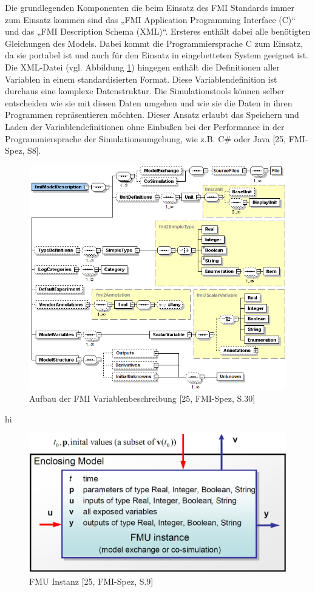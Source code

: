 Die grundlegenden Komponenten die beim Einsatz des FMI Standards immer zum Einsatz kommen sind das „FMI Application Programming Interface (C)“ und das „FMI Description Schema (XML)“. Ersteres enthält dabei alle benötigten Gleichungen des Models. Dabei kommt die Programmiersprache C zum Einsatz, da sie portabel ist und auch für den Einsatz in eingebetteten System geeignet ist. Die XML-Datei (vgl. Abbildung \ref{fig:FMIOverview}) hingegen enthält die Definitionen aller Variablen in einem standardisierten Format. Diese Variablendefinition ist durchaus eine komplexe Datenstruktur. Die Simulationstools können selber entscheiden wie sie mit diesen Daten umgehen und wie sie die Daten in ihren Programmen repräsentieren möchten. Dieser Ansatz erlaubt das Speichern und Laden der Variablendefinitionen ohne Einbußen bei der Performance in der Programmiersprache der Simulationsumgebung, wie z.B. C\# oder Java [25, FMI-Spez, S8].
\newline
\begin{figure}[h]
	\centering
	\includegraphics[width=0.7\linewidth]{Bilder/A20_FMIOverview}
	\caption{Aufbau der FMI Variablenbeschreibung [25, FMI-Spez, S.30]}
	\label{fig:FMIOverview}
\end{figure}
\newline
hi

\begin{figure}[h]
	\centering
	\includegraphics[width=0.7\linewidth]{Bilder/A21_FMIBlock}
	\caption{FMU Instanz [25, FMI-Spez, S.9]}
	\label{fig:FMIBlock}
\end{figure}

